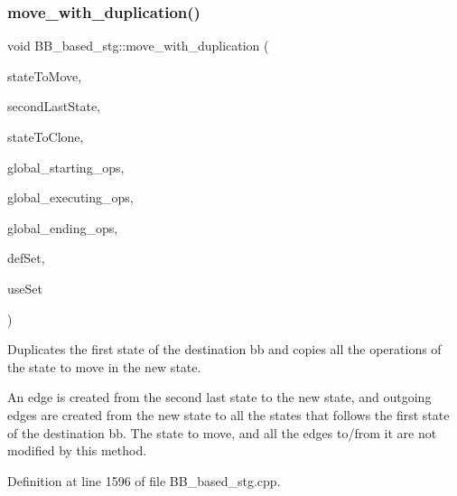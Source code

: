 \subsubsection{\texorpdfstring{move\+\_\+with\+\_\+duplication()}{move\_with\_duplication()}}
{\footnotesize\ttfamily void B\+B\+\_\+based\+\_\+stg\+::move\+\_\+with\+\_\+duplication (\begin{DoxyParamCaption}\item[{const \hyperlink{graph_8hpp_abefdcf0544e601805af44eca032cca14}{vertex}}]{state\+To\+Move,  }\item[{const \hyperlink{graph_8hpp_abefdcf0544e601805af44eca032cca14}{vertex}}]{second\+Last\+State,  }\item[{const \hyperlink{graph_8hpp_abefdcf0544e601805af44eca032cca14}{vertex}}]{state\+To\+Clone,  }\item[{const std\+::map$<$ \hyperlink{graph_8hpp_abefdcf0544e601805af44eca032cca14}{vertex}, std\+::list$<$ \hyperlink{graph_8hpp_abefdcf0544e601805af44eca032cca14}{vertex} $>$$>$ \&}]{global\+\_\+starting\+\_\+ops,  }\item[{const std\+::map$<$ \hyperlink{graph_8hpp_abefdcf0544e601805af44eca032cca14}{vertex}, std\+::list$<$ \hyperlink{graph_8hpp_abefdcf0544e601805af44eca032cca14}{vertex} $>$$>$ \&}]{global\+\_\+executing\+\_\+ops,  }\item[{const std\+::map$<$ \hyperlink{graph_8hpp_abefdcf0544e601805af44eca032cca14}{vertex}, std\+::list$<$ \hyperlink{graph_8hpp_abefdcf0544e601805af44eca032cca14}{vertex} $>$$>$ \&}]{global\+\_\+ending\+\_\+ops,  }\item[{const \hyperlink{classCustomOrderedSet}{Custom\+Ordered\+Set}$<$ unsigned int $>$ \&}]{def\+Set,  }\item[{const \hyperlink{classCustomOrderedSet}{Custom\+Ordered\+Set}$<$ unsigned int $>$ \&}]{use\+Set }\end{DoxyParamCaption})\hspace{0.3cm}{\ttfamily [private]}}



Duplicates the first state of the destination bb and copies all the operations of the state to move in the new state. 

An edge is created from the second last state to the new state, and outgoing edges are created from the new state to all the states that follows the first state of the destination bb. The state to move, and all the edges to/from it are not modified by this method. 

Definition at line 1596 of file B\+B\+\_\+based\+\_\+stg.\+cpp.



